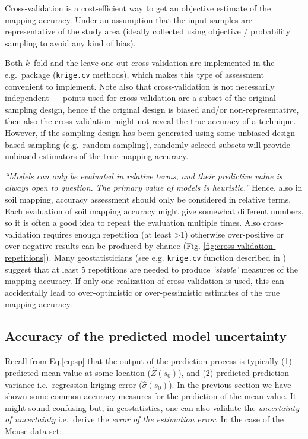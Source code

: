 \documentclass[graybox,natbib,nospthms,UStrade]{svmono}
\let\BeginKnitrBlock\begin \let\EndKnitrBlock\end
\let\BeginKnitrBlock\begin \let\EndKnitrBlock\end
\begin{document}
\BeginKnitrBlock{rmdnote}
Cross-validation is a cost-efficient way to get an objective estimate of
the mapping accuracy. Under an assumption that the input samples are
representative of the study area (ideally collected using objective /
probability sampling to avoid any kind of bias).
\EndKnitrBlock{rmdnote}

Both \(k\)--fold and the leave-one-out cross validation are implemented in
the e.g.~package (\texttt{krige.cv} methods), which makes this type of
assessment convenient to implement. Note also that cross-validation is
not necessarily independent --- points used for cross-validation are a
subset of the original sampling design, hence if the original design is
biased and/or non-representative, then also the cross-validation might
not reveal the true accuracy of a technique. However, if the sampling
design has been generated using some unbiased design based sampling
(e.g.~random sampling), randomly seleced subsets will provide unbiased
estimators of the true mapping accuracy.

\emph{``Models can only be evaluated in relative terms, and their predictive value is always open to question. The primary value of models is heuristic.''} \citep{Oreskes04021994}
Hence, also in soil mapping, accuracy assessment
should only be considered in relative terms. Each evaluation of soil
mapping accuracy might give somewhat different numbers, so it is often a
good idea to repeat the evaluation multiple times. Also cross-validation
requires enough repetition (at least \textgreater{}1) otherwise over-positive or
over-negative results can be produced by chance
(Fig. \ref{fig:cross-validation-repetitions}). Many geostatisticians
(see e.g. \texttt{krige.cv} function described in \citet[pp.222--223]{Bivand2008Springer}) suggest that at least 5 repetitions are needed to produce
\emph{`stable'} measures of the mapping accuracy. If only one realization of
cross-validation is used, this can accidentally lead to over-optimistic
or over-pessimistic estimates of the true mapping accuracy.

\hypertarget{accuracy-of-the-predicted-model-uncertainty}{%
\subsection{Accuracy of the predicted model uncertainty}\label{accuracy-of-the-predicted-model-uncertainty}}

Recall from Eq.\eqref{eq:sp} that the output of the prediction process is
typically (1) predicted mean value at some location
(\(\hat Z({{s}}_0)\)), and (2) predicted prediction variance
i.e.~regression-kriging error (\(\hat{\sigma}({{s}}_0)\)). In the previous
section we have shown some common accuracy measures for the prediction
of the mean value. It might sound confusing but, in geostatistics, one
can also validate the \emph{uncertainty of uncertainty} i.e.~derive the
\emph{error of the estimation error}. In the case of the Meuse data set:
\end{document}
